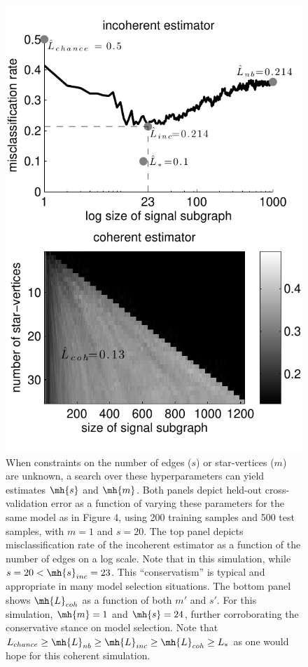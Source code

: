 \documentclass[10pt,journal,cspaper,compsoc]{IEEEtran}
\begin{document}
\begin{figure}[htbp]
	\centering
		\includegraphics[width=0.8\linewidth]{../figs/coherent_image_V70_s20_p10_q30_nTr200_nTe500.pdf}
	\caption{ When constraints on the number of edges ($s$) or star-vertices ($m$) are unknown, a search over these hyperparameters can yield estimates $\mh{s}$ and $\mh{m}$.  Both panels depict held-out cross-validation error as a function of varying these parameters for the same model as in Figure 4, using 200 training samples and 500 test samples, with $m=1$ and $s=20$.  The top panel depicts misclassification rate of the incoherent estimator as a function of the number of edges on a log scale. Note that in this simulation, while $s=20< \mh{s}_{inc}=23$.  This ``conservatism'' is typical and appropriate in many model selection situations.  The bottom panel shows $\mh{L}_{coh}$ as a function of both $m'$ and $s'$.  For this simulation, $\mh{m}=1$ and $\mh{s}=24$, further corroborating the conservative stance on model selection. Note that $L_{chance} \geq \mh{L}_{nb} \geq \mh{L}_{inc} \geq \mh{L}_{coh} \geq L_*$ as one would hope for this coherent simulation.}
	\label{fig:coherent}
\end{figure}
\end{document}
